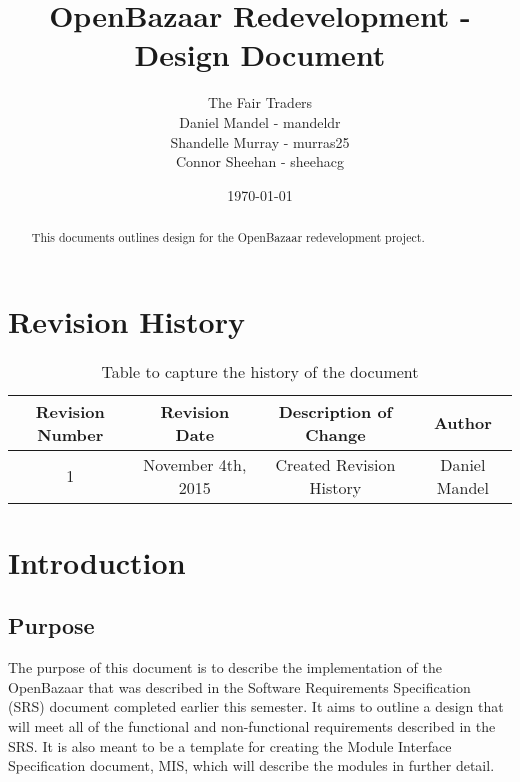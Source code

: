 \documentclass{article}
\begin{document}
\title{OpenBazaar Redevelopment - Design Document}
\author{The Fair Traders \\ Daniel Mandel - mandeldr \\ Shandelle Murray - murras25 \\ Connor Sheehan - sheehacg}
\date{\today}
\maketitle

\begin{abstract}
This documents outlines design for the OpenBazaar redevelopment project.
\end{abstract}

\newpage

\tableofcontents

\section*{Revision History}

\begin{table}[h!]
\centering
\begin{tabular}{||c c c c||}
 \hline
 Revision Number & Revision Date & Description of Change & Author \\ [0.5ex]
 \hline\hline
 1 & November 4th, 2015 & Created Revision History & Daniel Mandel \\ [1ex]
 \hline
\end{tabular}
\caption{Table to capture the history of the document}
\label{table:1}
\end{table}

\section*{Introduction}
\subsection{Purpose}
The purpose of this document is to describe the implementation of the OpenBazaar that was described in the Software Requirements Specification (SRS) document completed earlier this semester. It aims to outline a design that will meet all of the functional and non-functional requirements described in the SRS. It is also meant to be a template for creating the Module Interface Specification document, MIS, which will describe the modules in further detail. 
\end{document}
